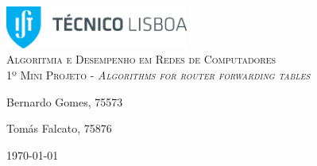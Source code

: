 \begin{titlepage}

	\begin{center}

		\includegraphics[width=6cm]{./title}\\[3cm]

		\textsc{\LARGE Algoritmia e Desempenho em Redes de Computadores}\\[1.5cm]

		\textsc{\Large 1º Mini Projeto - \textit{Algorithms for router forwarding tables}}\\[1.5cm]


		


		\noindent
		\begin{minipage}{0.4\textwidth}
			\begin{flushleft} \large
				Bernardo Gomes, 75573
			\end{flushleft}
		\end{minipage}
		\begin{minipage}{0.4\textwidth}
			\begin{flushright} \large
				Tomás Falcato, 75876
			\end{flushright}
		\end{minipage}

		\vfill

		{\large \today}


	\end{center}

\end{titlepage}
